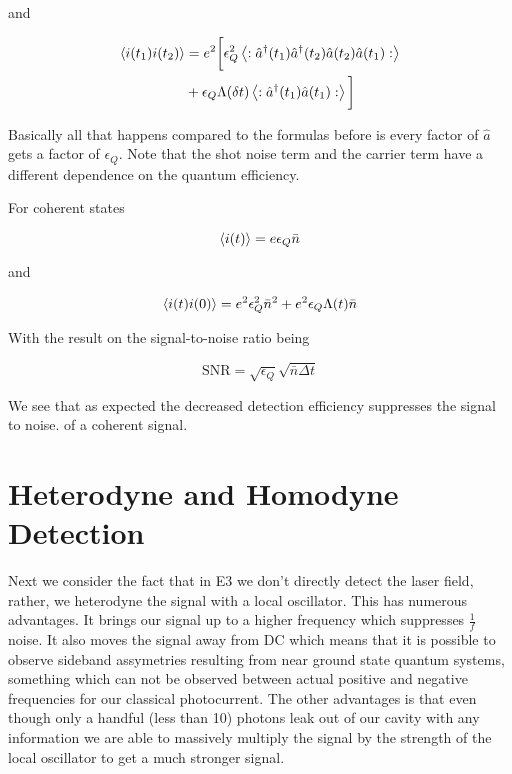 \documentclass[12pt]{article}
\begin{document}
and

\begin{align}
\braket{i(t_1)i(t_2)} &= e^2 \bigg[ \epsilon_Q^2  \left<: \hat{a}^{\dag}(t_1)\hat{a}^{\dag}(t_2)\hat{a}(t_2)\hat{a}(t_1):\right> \\
&+ \epsilon_Q \Lambda(\delta t)\left<:\hat{a}^{\dag}(t_1)\hat{a}(t_1):\right> \bigg]
\end{align}

Basically all that happens compared to the formulas before is every factor of $\hat{a}$ gets a factor of $\epsilon_Q$. Note that the shot noise term and the carrier term have a different dependence on the quantum efficiency.

For coherent states

\begin{equation}
\braket{i(t)} = e \epsilon_Q \bar{n}
\end{equation}

and

\begin{align}
\braket{i(t)i(0)} = e^2 \epsilon_Q^2 \bar{n}^2 + e^2 \epsilon_Q \Lambda(t) \bar{n}
\end{align}

With the result on the signal-to-noise ratio being

\begin{equation}
\text{SNR} = \sqrt{\epsilon_Q}\sqrt{\bar{n} \Delta t}
\end{equation}

We see that as expected the decreased detection efficiency suppresses the signal to noise. of a coherent signal.


\section{Heterodyne and Homodyne Detection}

Next we consider the fact that in E3 we don't directly detect the laser field, rather, we heterodyne the signal with a local oscillator. This has numerous advantages. It brings our signal up to a higher frequency which suppresses $\frac{1}{f}$ noise. It also moves the signal away from DC which means that it is possible to observe sideband assymetries resulting from near ground state quantum systems, something which can not be observed between actual positive and negative frequencies for our classical photocurrent. The other advantages is that even though only a handful (less than 10) photons leak out of our cavity with any information we are able to massively multiply the signal by the strength of the local oscillator to get a much stronger signal. 
\end{document}
